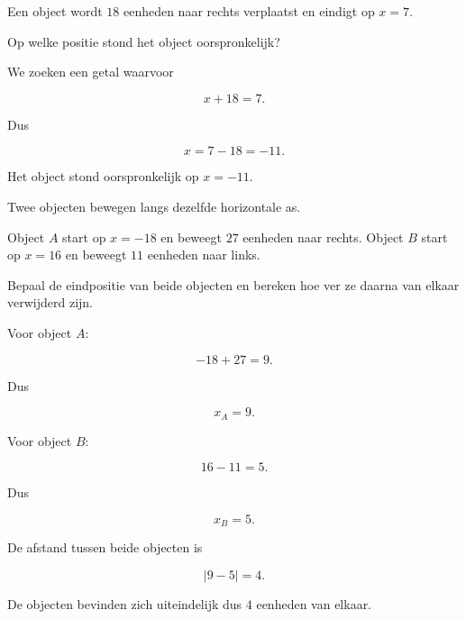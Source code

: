 \documentclass{ximera}
\begin{document}
    
    \begin{oefening}{\oefU}
    
    Een object wordt \(18\) eenheden naar rechts verplaatst en eindigt op
    \(x=7\).
    
    \begin{question}
    
    Op welke positie stond het object oorspronkelijk?
    
    \begin{oplossing}
    
    We zoeken een getal waarvoor
    
    \[
    x+18=7.
    \]
    
    Dus
    
    \[
    x=7-18=-11.
    \]
    
    Het object stond oorspronkelijk op \(x=-11\).
    
    \end{oplossing}
    
    \end{question}
    
    \end{oefening}


\begin{oefening}{\oefG}

    Twee objecten bewegen langs dezelfde horizontale as.
    
    Object \(A\) start op \(x=-18\) en beweegt \(27\) eenheden naar rechts.
    Object \(B\) start op \(x=16\) en beweegt \(11\) eenheden naar links.
    
    \begin{question}
    
    Bepaal de eindpositie van beide objecten en bereken hoe ver ze daarna
    van elkaar verwijderd zijn.
    
    \begin{oplossing}
    
    Voor object \(A\):
    
    \[
    -18+27=9.
    \]
    
    Dus
    
    \[
    x_A=9.
    \]
    
    Voor object \(B\):
    
    \[
    16-11=5.
    \]
    
    Dus
    
    \[
    x_B=5.
    \]
    
    De afstand tussen beide objecten is
    
    \[
    |9-5|=4.
    \]
    
    De objecten bevinden zich uiteindelijk dus \(4\) eenheden van elkaar.
    
    \end{oplossing}
    
    \end{question}
    
    \end{oefening}
    
\end{document}
